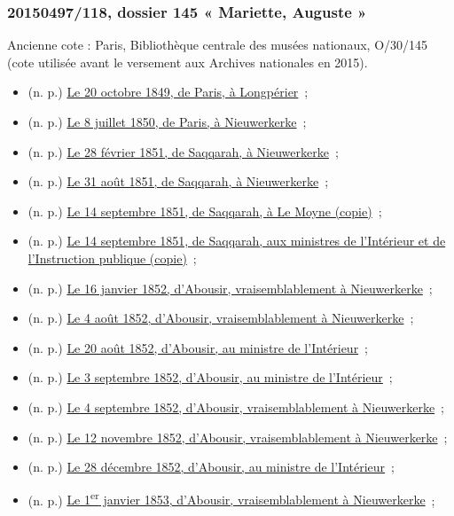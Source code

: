 \documentclass{book}
\begin{document}
\subsubsection*{20150497/118, dossier 145 « Mariette, Auguste »}
\noindent Ancienne cote : Paris, Bibliothèque centrale des musées nationaux, O/30/145 (cote utilisée avant le versement aux Archives nationales en 2015).
\begin{itemize}
\item (n. p.) \hyperlink{CoEg_Mariette_1849-10-20}{Le 20 octobre 1849, de Paris, à Longpérier}~;
\item (n. p.) \hyperlink{CoEg_Mariette_1850-07-08}{Le 8 juillet 1850, de Paris, à Nieuwerkerke}~;
\item (n. p.) \hyperlink{CoEg_Mariette_1851-02-28}{Le 28 février 1851, de Saqqarah, à Nieuwerkerke}~;
\item (n. p.) \hyperlink{CoEg_Mariette_1851-08-31}{Le 31 août 1851, de Saqqarah, à Nieuwerkerke}~;
\item (n. p.) \hyperlink{CoEg_Mariette_1851-09-14a}{Le 14 septembre 1851, de Saqqarah, à Le Moyne (copie)}~;
\item (n. p.) \hyperlink{CoEg_Mariette_1851-09-14b}{Le 14 septembre 1851, de Saqqarah, aux ministres de l’Intérieur et de l’Instruction publique (copie)}~;
\item (n. p.) \hyperlink{CoEg_Mariette_1852-01-16}{Le 16 janvier 1852, d’Abousir, vraisemblablement à Nieuwerkerke}~;
\item (n. p.) \hyperlink{CoEg_Mariette_1852-08-04}{Le 4 août 1852, d’Abousir, vraisemblablement à Nieuwerkerke}~;
\item (n. p.) \hyperlink{CoEg_Mariette_1852-08-20}{Le 20 août 1852, d’Abousir, au ministre de l'Intérieur}~;
\item (n. p.) \hyperlink{CoEg_Mariette_1852-09-03}{Le 3 septembre 1852, d’Abousir, au ministre de l'Intérieur}~;
\item (n. p.) \hyperlink{CoEg_Mariette_1852-09-04}{Le 4 septembre 1852, d’Abousir, vraisemblablement à Nieuwerkerke}~;
\item (n. p.) \hyperlink{CoEg_Mariette_1852-11-12}{Le 12 novembre 1852, d’Abousir, vraisemblablement à Nieuwerkerke}~;
\item (n. p.) \hyperlink{CoEg_Mariette_1852-12-28}{Le 28 décembre 1852, d’Abousir, au ministre de l'Intérieur}~;
\item (n. p.) \hyperlink{CoEg_Mariette_1853-01-01}{Le 1\textsuperscript{er} janvier 1853, d’Abousir, vraisemblablement à Nieuwerkerke}~;

\end{itemize}
\end{document}
